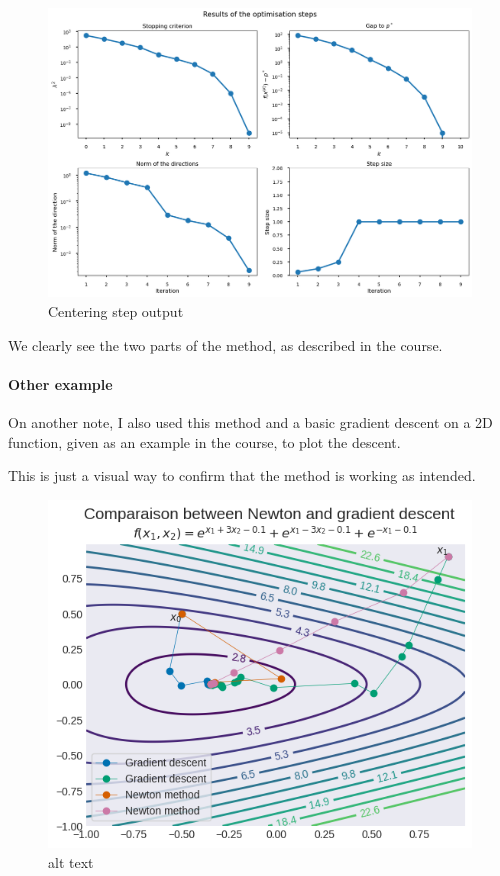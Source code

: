 \documentclass[11pt]{article}
\begin{document}
\begin{figure}
\centering
\includegraphics{outputs/example_output_centering-10.png}
\caption{Centering step output}
\end{figure}

We clearly see the two parts of the method, as described in the course.

    \hypertarget{other-example}{%
\paragraph{Other example}\label{other-example}}

On another note, I also used this method and a basic gradient descent on
a 2D function, given as an example in the course, to plot the descent.

This is just a visual way to confirm that the method is working as
intended.

\begin{figure}
\centering
\includegraphics{outputs/comparaison_newton_gradient_4.png}
\caption{alt text}
\end{figure}
\end{document}
